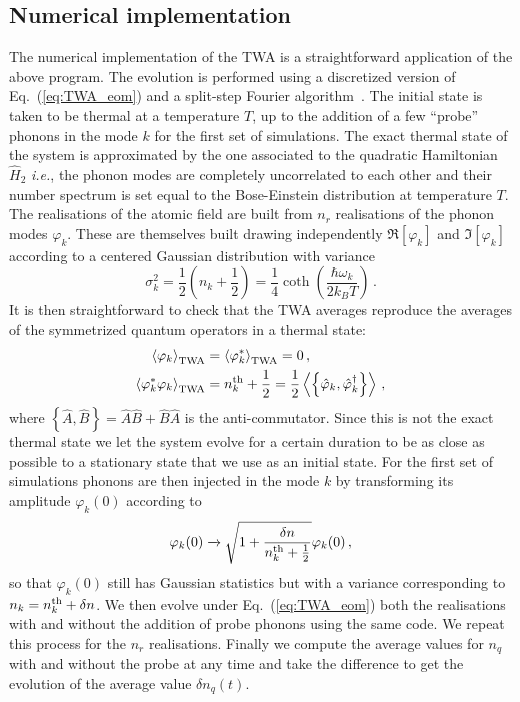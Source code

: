 \documentclass[aps,prd,notitlepage,amsfonts,amssymb,amsmath,nofootinbib,superscriptaddress,longbibliography]{revtex4-2}
\begin{document}
\begin{appendices}
\subsection{Numerical implementation }

The numerical implementation of the TWA is a straightforward application of the above program. The evolution is performed using a discretized version of Eq.~(\ref{eq:TWA_eom}) and a split-step Fourier algorithm~\cite{AgrawalBook}.
The initial state is taken to be thermal at a temperature $T$, up to the addition of a few ``probe'' phonons in the mode $k$ for the first set of simulations. The exact thermal state of the system is approximated by the one associated to the quadratic Hamiltonian $\hat{H}_2$ {\it i.e.}, the phonon modes are completely uncorrelated to each other and their number spectrum is set equal to the Bose-Einstein distribution at temperature $T$. The realisations of the atomic field are built from $n_r$ realisations of the phonon modes $\varphi_k$. These are themselves built drawing independently $\Re \left[ \varphi_k \right]$ and $\Im \left[ \varphi_k \right]$ according to a centered Gaussian distribution with variance
\begin{equation}
   \sigma_k^2 = \frac{1}{2} \left( n_k + \frac{1}{2} \right) =  \frac{1}{4} \coth \left( \frac{\hbar \omega_k}{2 k_B T} \right)  \, .
\end{equation}
It is then straightforward to check that the TWA averages reproduce the averages of the symmetrized quantum operators in a thermal state:
\begin{align}
\left \langle \varphi_k \right \rangle_{\rm TWA} & = \left \langle \varphi_k^{*} \right \rangle_{\rm TWA} = 0 \, , \\
\left \langle \varphi_k^{*} \varphi_k \right \rangle_{\rm TWA} & = n_k^{\rm th}+\frac{1}{2} = \frac{1}{2} \left \langle  \left\{ \hat{\varphi}_k , \hat{\varphi}_k^{\dagger} \right\} \right \rangle \, ,  
\end{align}
where $\left\{ \hat{A} , \hat{B} \right\} = \hat{A} \hat{B} + \hat{B}\hat{A}$ is the anti-commutator. Since this is not the exact thermal state we let the system evolve for a certain duration to be as close as possible to a stationary state that we use as an initial state.
For the first set of simulations phonons are then injected in the mode $k$ by transforming its amplitude $\varphi_k(0)$ according to
\begin{equation}
    \varphi_k(0) \xrightarrow[]{} \sqrt{ 1 + \frac{\delta n}{n_k^{\rm th}+\frac{1}{2} }  }  \varphi_k(0)  \, , 
\end{equation}
so that $\varphi_k(0)$ still has Gaussian statistics but with a variance corresponding to $n_k = n_k^{\rm th} + \delta n$.
We then evolve under Eq.~(\ref{eq:TWA_eom}) both the realisations with and without the addition of probe phonons using the same code. We repeat this process for the $n_r$ realisations. Finally we compute the average values for $n_q$ with and without the probe at any time and take the difference to get the evolution of the average value $\delta n_q (t)$. 


\end{appendices}
\end{document}
